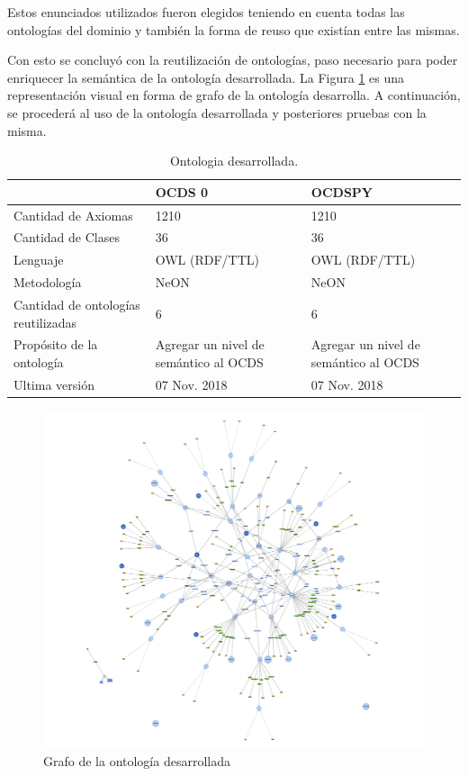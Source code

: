 Estos enunciados utilizados fueron elegidos teniendo en cuenta todas las ontologías del dominio y también la forma de reuso que existían entre las mismas. 

Con esto se concluyó con la reutilización de ontologías, paso necesario para poder enriquecer la semántica de la ontología desarrollada. La Figura \ref{img:grafo ontologia desarrolla} es una representación visual en forma de grafo de la ontología desarrolla. A continuación, se procederá al uso de la ontología desarrollada y posteriores pruebas con la misma.


\begin{table}[!htb]
    \caption{Ontologia desarrollada.}
    \label{tab:comparacion_ontologias}
    
    \scriptsize 
    \begin{tabular}{|L{6cm}|C{2.5cm}|C{2.5cm}}
    \hline
     &  OCDS 0  & OCDSPY \\
    \hline
    Cantidad de Axiomas & 1210 & 1210 \\
    \hline
    Cantidad de Clases & 36 & 36 \\
    \hline
    Lenguaje & OWL (RDF/TTL) & OWL (RDF/TTL) \\
    \hline
    Metodología & NeON & NeON \\
     \hline
    Cantidad de ontologías reutilizadas & 6 & 6\\
    \hline
    Propósito de la ontología & Agregar un nivel de semántico al OCDS  & Agregar un nivel de semántico al OCDS \\
    \hline
    Ultima versión & 07 Nov. 2018 & 07 Nov. 2018 \\
    \hline
    \end{tabular}
    \bigskip
\end{table}

\begin{figure}[ht!]
    \includegraphics[width=180mm]{figuras/grafoOCDS.png}
    \caption{Grafo de la ontología desarrollada}
    \label{img:grafo ontologia desarrolla}
    \end{figure}

